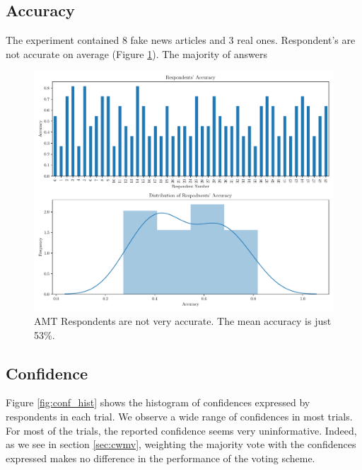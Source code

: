 \documentclass{report}
\theoremstyle{definition}
\begin{document}
\subsection{Accuracy}
The experiment contained 8 fake news articles and 3 real ones. Respondent's are not accurate on average (Figure \ref{fig:exp1_acc}). The majority of answers 
\begin{figure}
    \centering
    \includegraphics[width=\textwidth]{exp1_accuracy.pdf}
    \caption{AMT Respondents are not very accurate. The mean accuracy is just 53\%.}
    \label{fig:exp1_acc}
\end{figure}




\subsection{Confidence}
Figure \ref{fig:conf_hist} shows the histogram of confidences expressed by respondents in each trial. We observe a wide range of confidences in most trials. For most of the trials, the reported confidence seems very uninformative. Indeed, as we see in section \ref{sec:cwmv}, weighting the majority vote with the confidences expressed makes no difference in the performance of the voting scheme.
\end{document}
